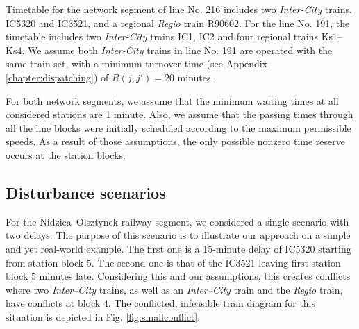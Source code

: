 Timetable for the network segment of line No. 216 includes two
\emph{Inter-City} trains, IC5320 and IC3521, and a regional \emph{Regio} train
R90602. For the line No. 191, the timetable includes two \emph{Inter-City}
trains IC1, IC2 and four regional trains Ks1--Ks4. We assume both
\emph{Inter-City} trains in line No. 191 are operated with the same train set,
with a minimum turnover time (see Appendix \ref{chapter:dispatching}) of
$R(j,j') = 20$ minutes.

For both network segments, we assume that the minimum waiting times at all
considered stations are 1 minute. Also, we assume that the passing times
through all the line blocks were initially scheduled according to the maximum
permissible speeds. As a result of those assumptions, the only possible nonzero
time reserve occurs at the station blocks.

\subsection{Disturbance scenarios}

For the Nidzica--Olsztynek railway segment, we considered a single scenario
with two delays. The purpose of this scenario is to illustrate our approach on
a simple and yet real-world example. The first one is a 15-minute delay of
IC5320 starting from station block 5. The second one is that of the IC3521
leaving first station block 5 minutes late. Considering this and our assumptions,
this creates conflicts where two \emph{Inter--City} trains, as well as an
\emph{Inter--City} train and the \emph{Regio} train, have conflicts at block 4.
The conflicted, infeasible train diagram for this situation is depicted in Fig.
\ref{fig:smallconflict}.

